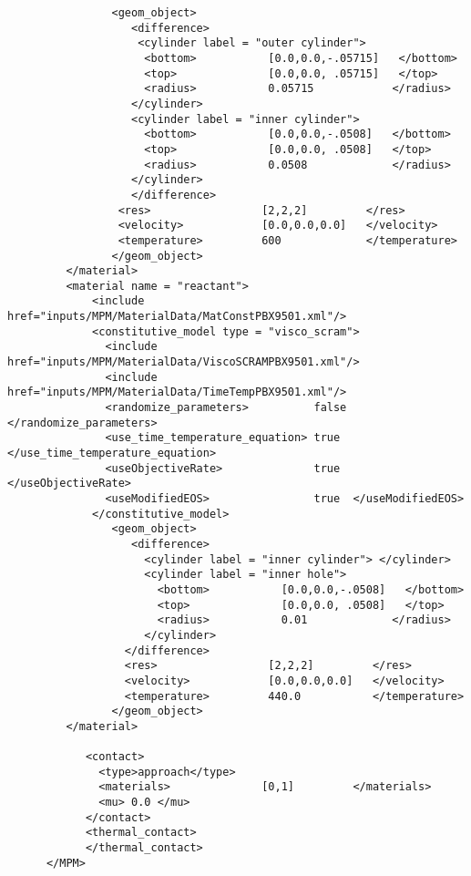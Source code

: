 \begin{lstlisting}
                <geom_object>
                   <difference>
                    <cylinder label = "outer cylinder">
                     <bottom>           [0.0,0.0,-.05715]   </bottom>
                     <top>              [0.0,0.0, .05715]   </top>
                     <radius>           0.05715            </radius>
                   </cylinder>
                   <cylinder label = "inner cylinder">
                     <bottom>           [0.0,0.0,-.0508]   </bottom>
                     <top>              [0.0,0.0, .0508]   </top>
                     <radius>           0.0508             </radius>
                   </cylinder>
                   </difference>
                 <res>                 [2,2,2]         </res>
                 <velocity>            [0.0,0.0,0.0]   </velocity>
                 <temperature>         600             </temperature>
                </geom_object>
         </material>
         <material name = "reactant">
             <include href="inputs/MPM/MaterialData/MatConstPBX9501.xml"/>
             <constitutive_model type = "visco_scram">
               <include href="inputs/MPM/MaterialData/ViscoSCRAMPBX9501.xml"/>
               <include href="inputs/MPM/MaterialData/TimeTempPBX9501.xml"/>
               <randomize_parameters>          false </randomize_parameters>
               <use_time_temperature_equation> true  </use_time_temperature_equation>
               <useObjectiveRate>              true  </useObjectiveRate>
               <useModifiedEOS>                true  </useModifiedEOS>
             </constitutive_model>
                <geom_object>
                   <difference>
                     <cylinder label = "inner cylinder"> </cylinder>
                     <cylinder label = "inner hole">
                       <bottom>           [0.0,0.0,-.0508]   </bottom>
                       <top>              [0.0,0.0, .0508]   </top>
                       <radius>           0.01             </radius>
                     </cylinder>
                  </difference>
                  <res>                 [2,2,2]         </res>
                  <velocity>            [0.0,0.0,0.0]   </velocity>
                  <temperature>         440.0           </temperature>
                </geom_object>
         </material>

            <contact>
              <type>approach</type>
              <materials>              [0,1]         </materials>
              <mu> 0.0 </mu>
            </contact>
            <thermal_contact>
            </thermal_contact>
      </MPM>


\end{lstlisting}
